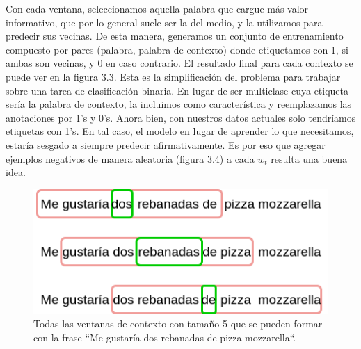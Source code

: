 Con cada ventana, seleccionamos aquella palabra que cargue más valor
informativo, que por lo general suele ser la del medio, y la utilizamos para
predecir sus vecinas. De esta manera, generamos un conjunto de entrenamiento
compuesto por pares (palabra, palabra de contexto) donde etiquetamos con 1, si
ambas son vecinas, y 0 en caso contrario. El resultado final para cada contexto
se puede ver en la figura 3.3. Esta es la simplificación del problema para
trabajar sobre una tarea de clasificación binaria. En lugar de ser multiclase
cuya  etiqueta sería la palabra de contexto, la incluimos como característica y
reemplazamos las anotaciones por 1's y 0's. Ahora bien, con nuestros datos
actuales solo tendríamos etiquetas con 1's. En tal caso, el modelo en lugar de
aprender lo que necesitamos, estaría sesgado a siempre predecir afirmativamente.
Es por eso que agregar ejemplos negativos de manera aleatoria (figura 3.4) a
cada $w_t$ resulta una buena idea.

\begin{figure}
    \centering
    \includegraphics[scale=0.60]{figures/context_example_1.png}
    \caption{Todas las ventanas de contexto con tamaño 5 que se pueden formar con la frase
             ``Me gustaría dos rebanadas de pizza mozzarella``.}
\end{figure}

